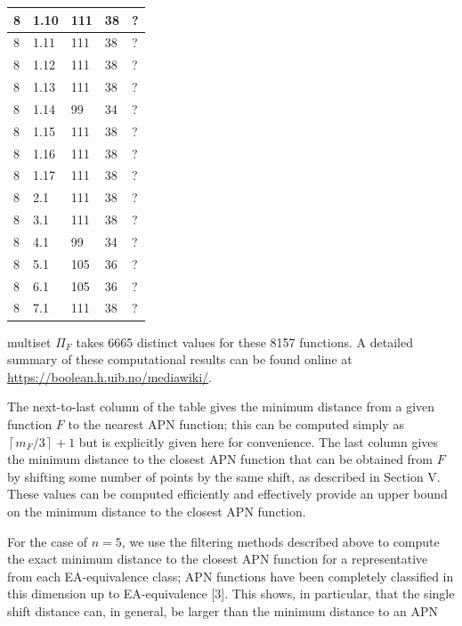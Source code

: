 \documentclass[10pt]{article}
\begin{document}
\begin{table}[h]
\begin{center}
\begin{tabular}{|l|l|l|l|l|}
\hline
8 & 1.10 & 111 & 38 & ? \\
\hline
8 & 1.11 & 111 & 38 & ? \\
\hline
8 & 1.12 & 111 & 38 & ? \\
\hline
8 & 1.13 & 111 & 38 & ? \\
\hline
8 & 1.14 & 99 & 34 & ? \\
\hline
8 & 1.15 & 111 & 38 & ? \\
\hline
8 & 1.16 & 111 & 38 & ? \\
\hline
8 & 1.17 & 111 & 38 & ? \\
\hline
8 & 2.1 & 111 & 38 & ? \\
\hline
8 & 3.1 & 111 & 38 & ? \\
\hline
8 & 4.1 & 99 & 34 & ? \\
\hline
8 & 5.1 & 105 & 36 & ? \\
\hline
8 & 6.1 & 105 & 36 & ? \\
\hline
8 & 7.1 & 111 & 38 & ? \\
\hline
\end{tabular}
\end{center}
\end{table}

multiset $\Pi_{F}$ takes 6665 distinct values for these 8157 functions. A detailed summary of these computational results can be found online at \href{https://boolean.h.uib.no/mediawiki/}{https://boolean.h.uib.no/mediawiki/}.

The next-to-last column of the table gives the minimum distance from a given function $F$ to the nearest APN function; this can be computed simply as $\left\lceil m_{F} / 3\right\rceil+1$ but is explicitly given here for convenience. The last column gives the minimum distance to the closest APN function that can be obtained from $F$ by shifting some number of points by the same shift, as described in Section V. These values can be computed efficiently and effectively provide an upper bound on the minimum distance to the closest APN function.

For the case of $n=5$, we use the filtering methods described above to compute the exact minimum distance to the closest APN function for a representative from each EA-equivalence class; APN functions have been completely classified in this dimension up to EA-equivalence [3]. This shows, in particular, that the single shift distance can, in general, be larger than the minimum distance to an APN
\end{document}
